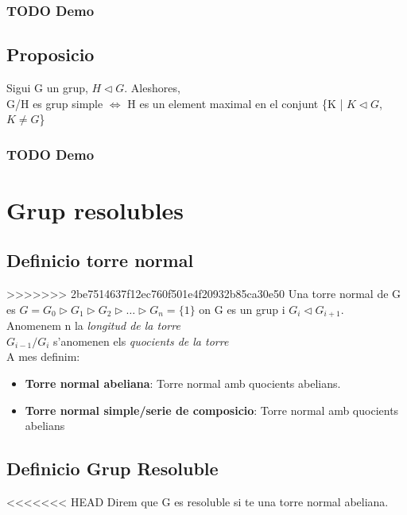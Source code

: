 \documentclass[11pt]{article}
\begin{document}
\subsubsection{{\bfseries\sffamily TODO} Demo}
\label{sec:orgcc75409}
\subsection{Proposicio}
\label{sec:orgf79ab34}
    Sigui G un grup, \(H \vartriangleleft G\). Aleshores,\\
G/H es grup simple \(\iff\) H es un element maximal en el conjunt \{K | \(K \vartriangleleft G\), \(K \neq G\)\}
\subsubsection{{\bfseries\sffamily TODO} Demo}
\label{sec:orgbe0ff8d}

\section{Grup resolubles}
\label{sec:orge00173b}

\subsection{Definicio torre normal}
\label{sec:orge538958}
>>>>>>> 2be7514637f12ec760f501e4f20932b85ca30e50
Una torre normal de G es \(G = G_0 \vartriangleright G_1 \vartriangleright G_2 \vartriangleright \ldots \vartriangleright G_n = \{1\}\) on G es un grup i \(G_i \vartriangleleft G_{i+1}\). \\
Anomenem n la \emph{longitud de la torre} \\
\(G_{i-1}/G_i\) s'anomenen els \emph{quocients de la torre} \\

A mes definim:
\begin{itemize}
\item \textbf{Torre normal abeliana}: Torre normal amb quocients abelians.
\item \textbf{Torre normal simple/serie de composicio}: Torre normal amb quocients abelians
\end{itemize}

\subsection{Definicio Grup Resoluble}
<<<<<<< HEAD
\label{sec:org5251e79}
Direm que G es resoluble si te una torre normal abeliana.
\end{document}
